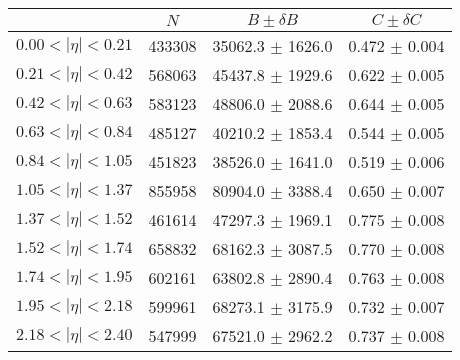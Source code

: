 \begin{tabular}{lccc}
\hline
    &   $N$   & $B \pm \delta B$  &  $C \pm \delta C$ \\
\hline
$0.00 < |\eta| <0.21$          & 433308     & 35062.3    $\pm$ 1626.0 & 0.472      $\pm$ 0.004 \\
$0.21 < |\eta| <0.42$          & 568063     & 45437.8    $\pm$ 1929.6 & 0.622      $\pm$ 0.005 \\
$0.42 < |\eta| <0.63$          & 583123     & 48806.0    $\pm$ 2088.6 & 0.644      $\pm$ 0.005 \\
$0.63 < |\eta| <0.84$          & 485127     & 40210.2    $\pm$ 1853.4 & 0.544      $\pm$ 0.005 \\
$0.84 < |\eta| <1.05$          & 451823     & 38526.0    $\pm$ 1641.0 & 0.519      $\pm$ 0.006 \\
$1.05 < |\eta| <1.37$          & 855958     & 80904.0    $\pm$ 3388.4 & 0.650      $\pm$ 0.007 \\
$1.37 < |\eta| <1.52$          & 461614     & 47297.3    $\pm$ 1969.1 & 0.775      $\pm$ 0.008 \\
$1.52 < |\eta| <1.74$          & 658832     & 68162.3    $\pm$ 3087.5 & 0.770      $\pm$ 0.008 \\
$1.74 < |\eta| <1.95$          & 602161     & 63802.8    $\pm$ 2890.4 & 0.763      $\pm$ 0.008 \\
$1.95 < |\eta| <2.18$          & 599961     & 68273.1    $\pm$ 3175.9 & 0.732      $\pm$ 0.007 \\
$2.18 < |\eta| <2.40$          & 547999     & 67521.0    $\pm$ 2962.2 & 0.737      $\pm$ 0.008 \\
\hline
\end{tabular}
